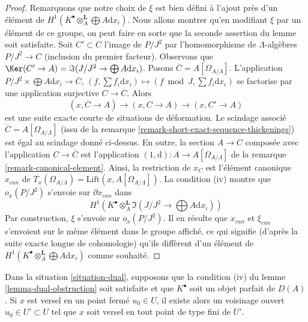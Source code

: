 \begin{proof}
\medskip\noindent
Remarquons que notre choix de $\xi$ est bien défini à l'ajout près d'un
élément de $H^1(K^\bullet \otimes_A^\mathbf{L} \bigoplus A\text{d}x_i)$.
Nous allons montrer qu'en modifiant $\xi$ par un élément de ce
groupe, on peut faire en sorte que la seconde assertion du lemme soit satisfaite.
Soit $C' \subset C$ l'image de $P/J^2$ par l'homomorphisme de
$\Lambda$-algèbres $P/J^2 \to C$ (inclusion du premier facteur).
Observons que
$\Ker(C' \to A) = \Im(J/J^2 \to \bigoplus A\text{d}x_i)$.
Posons $\overline{C} = A[\Omega_{A/\Lambda}]$. L'application
$P/J^2 \times \bigoplus A \text{d}x_i \to \overline{C}$,
$(f, \sum f_i \text{d}x_i) \mapsto (f \bmod J, \sum f_i \text{d}x_i)$
se factorise par une application surjective $C \to \overline{C}$. Alors
$$
(x, \overline{C} \to A) \to (x, C \to A) \to (x, C' \to A)
$$
est une suite exacte courte de situations de déformation. Le
scindage associé $\overline{C} = A[\Omega_{A/\Lambda}]$ (issu de la
remarque \ref{remark-short-exact-sequence-thickenings}) est égal au
scindage donné ci-dessus. En outre, la section $A \to C$ composée avec l'application
$C \to \overline{C}$
est l'application $(1, \text{d}) : A \to A[\Omega_{A/\Lambda}]$ de la
remarque \ref{remark-canonical-element}.
Ainsi, la restriction de $x_C$ est l'élément canonique $x_{can}$ de
$T_x(\Omega_{A/\Lambda}) = \text{Lift}(x, A[\Omega_{A/\Lambda}])$.
La condition (iv) montre que $o_x(P/J^2)$ s'envoie sur $\partial x_{can}$
dans
$$
H^1(K^\bullet \otimes_A^\mathbf{L} \Im(J/J^2 \to \bigoplus A\text{d}x_i))
$$
Par construction, $\xi$ s'envoie sur $o_x(P/J^2)$. Il en résulte que
$x_{can}$ et $\xi_{can}$ s'envoient sur le même élément dans le
groupe affiché, ce qui signifie (d'après la suite exacte longue de cohomologie)
qu'ils diffèrent d'un élément de
$H^1(K^\bullet \otimes_A^\mathbf{L} \bigoplus A\text{d}x_i)$
comme souhaité.
\end{proof}

\begin{lemma}
\label{lemma-dual-openness}
Dans la situation \ref{situation-dual}, supposons que la condition (iv) du
lemme \ref{lemma-dual-obstruction} soit satisfaite et que $K^\bullet$ soit un
objet parfait de $D(A)$. Si $x$ est versel en un point fermé
$u_0 \in U$, il existe alors un voisinage ouvert
$u_0 \in U' \subset U$ tel que $x$ soit versel en tout point de type fini
de $U'$.
\end{lemma}

